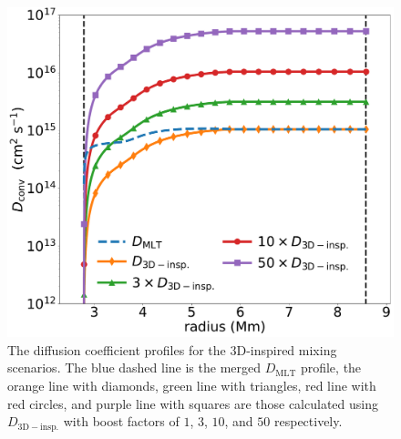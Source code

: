 \begin{figure}[!htbp]
\includegraphics[width=\textwidth]{chapters/2/figures/All_Dconv.pdf}
\caption{The diffusion coefficient profiles for the 3D-inspired mixing scenarios. The blue dashed line is the merged $D_{\mathrm{MLT}}$ profile,  the orange line with diamonds, green line with triangles, red line with red circles, and purple line with squares are those calculated using $D_{\mathrm{3D-insp.}}$ with boost factors of $1$, $3$, $10$, and $50$ respectively. 
\label{fig:all_dconv}}
\end{figure}


